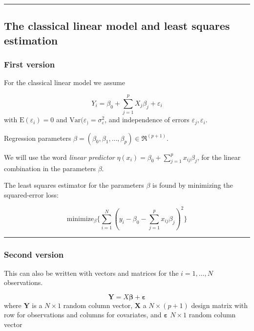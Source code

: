 \documentclass[
  letterpaper,
  DIV=11,
  numbers=noendperiod]{scrartcl}
\begin{document}
\begin{center}\rule{0.5\linewidth}{0.5pt}\end{center}

\hypertarget{the-classical-linear-model-and-least-squares-estimation}{%
\subsection{The classical linear model and least squares
estimation}\label{the-classical-linear-model-and-least-squares-estimation}}

\hypertarget{first-version}{%
\subsubsection{First version}\label{first-version}}

For the classical linear model we assume

\[ Y_i=\beta_0+\sum_{j=1}^p X_{j}\beta_j+\varepsilon_i\] with
\(\text{E}(\varepsilon_i)=0\) and
\(\text{Var}(\varepsilon_)=\sigma^2_{\varepsilon}\), and independence of
errors \(\varepsilon_j,\varepsilon_i\).

Regression parameters
\(\beta=(\beta_0,\beta_1,\ldots,\beta_p)\in \Re^{(p+1)}\).

We will use the word \emph{linear predictor}
\(\eta(x_i)=\beta_0+\sum_{j=1}^p x_{ij}\beta_j\), for the linear
combination in the parameters \(\beta\).

The least squares estimator for the parameters \(\beta\) is found by
minimizing the squared-error loss:

\[ \text{minimize}_{\beta} \{ \sum_{i=1}^N (y_i-\beta_0-\sum_{j=1}^p x_{ij}\beta_j)^2\}\]

\begin{center}\rule{0.5\linewidth}{0.5pt}\end{center}

\hypertarget{second-version}{%
\subsubsection{Second version}\label{second-version}}

This can also be written with vectors and matrices for the
\(i=1,\ldots,N\) observations.

\[{\mathbf Y=X \boldsymbol{\beta}}+{\boldsymbol\varepsilon}\] where
\({\mathbf Y}\) is a \(N \times 1\) random column vector,
\({\mathbf X}\) a \(N \times (p+1)\) design matrix with row for
observations and columns for covariates, and
\({\boldsymbol{\varepsilon}}\) \(N \times 1\) random column vector
\end{document}
